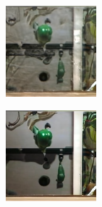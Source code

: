 \documentclass{article}
\begin{document}
\begin{figure}
\begin{subfigure}[b]{0.5\linewidth}
\begin{subfigure}[b]{0.242\linewidth}
        \end{subfigure}
        \hfill
    \end{subfigure}%
    \begin{subfigure}[b]{0.5\linewidth}
        \begin{subfigure}[b]{0.242\linewidth}
        \includegraphics[width=\linewidth]{figures/imagenet128/solver_samples/imagenet128_fm_ot_51_05.png}
        \end{subfigure}
        \begin{subfigure}[b]{0.242\linewidth}
        \includegraphics[width=\linewidth]{figures/imagenet128/solver_samples/imagenet128_fm_ot_51_10.png}

\end{subfigure}
\end{subfigure}
\end{figure}
\end{document}
